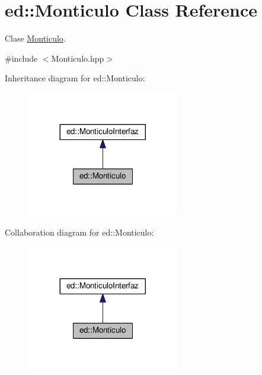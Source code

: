 \hypertarget{classed_1_1Monticulo}{}\section{ed\+:\+:Monticulo Class Reference}
\label{classed_1_1Monticulo}


Clase \hyperlink{classed_1_1Monticulo}{Monticulo}.  




{\ttfamily \#include $<$Monticulo.\+hpp$>$}



Inheritance diagram for ed\+:\+:Monticulo\+:\nopagebreak
\begin{figure}[H]
\begin{center}
\leavevmode
\includegraphics[width=188pt]{classed_1_1Monticulo__inherit__graph}
\end{center}
\end{figure}


Collaboration diagram for ed\+:\+:Monticulo\+:\nopagebreak
\begin{figure}[H]
\begin{center}
\leavevmode
\includegraphics[width=188pt]{classed_1_1Monticulo__coll__graph}
\end{center}
\end{figure}
